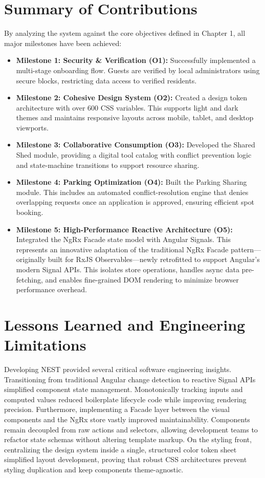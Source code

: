 \section{Summary of Contributions}
By analyzing the system against the core objectives defined in Chapter 1, all major milestones have been achieved:
\begin{itemize}
    \item \textbf{Milestone 1: Security \& Verification (O1):} Successfully implemented a multi-stage onboarding flow. Guests are verified by local administrators using secure blocks, restricting data access to verified residents.
    \item \textbf{Milestone 2: Cohesive Design System (O2):} Created a design token architecture with over 600 CSS variables. This supports light and dark themes and maintains responsive layouts across mobile, tablet, and desktop viewports.
    \item \textbf{Milestone 3: Collaborative Consumption (O3):} Developed the Shared Shed module, providing a digital tool catalog with conflict prevention logic and state-machine transitions to support resource sharing.
    \item \textbf{Milestone 4: Parking Optimization (O4):} Built the Parking Sharing module. This includes an automated conflict-resolution engine that denies overlapping requests once an application is approved, ensuring efficient spot booking.
    \item \textbf{Milestone 5: High-Performance Reactive Architecture (O5):} Integrated the NgRx Facade state model with Angular Signals. This represents an innovative adaptation of the traditional NgRx Facade pattern---originally built for RxJS Observables---newly retrofitted to support Angular's modern Signal APIs. This isolates store operations, handles async data pre-fetching, and enables fine-grained DOM rendering to minimize browser performance overhead.
\end{itemize}

\section{Lessons Learned and Engineering Limitations}

Developing NEST provided several critical software engineering insights. Transitioning from traditional Angular change detection to reactive Signal APIs simplified component state management. Monotonically tracking inputs and computed values reduced boilerplate lifecycle code while improving rendering precision. Furthermore, implementing a Facade layer between the visual components and the NgRx store vastly improved maintainability. Components remain decoupled from raw actions and selectors, allowing development teams to refactor state schemas without altering template markup. On the styling front, centralizing the design system inside a single, structured color token sheet simplified layout development, proving that robust CSS architectures prevent styling duplication and keep components theme-agnostic.

